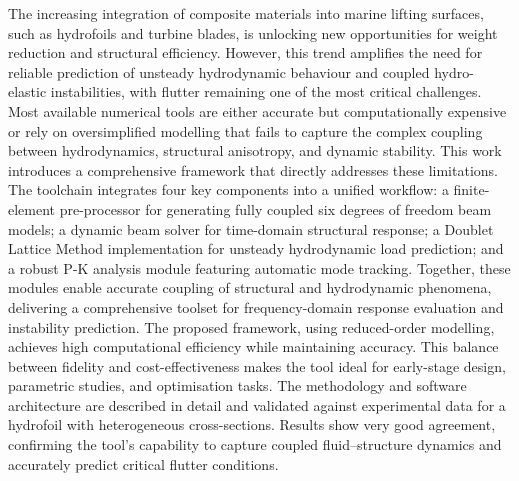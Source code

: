 


%    
%    

The increasing integration of composite materials into marine lifting surfaces, such as hydrofoils and turbine blades, 
is unlocking new opportunities for weight reduction and structural efficiency. However, this trend amplifies the need for reliable prediction 
of unsteady hydrodynamic behaviour and coupled hydro-elastic instabilities, with flutter remaining one of the most critical challenges. 
Most available numerical tools are either accurate but computationally expensive or rely on oversimplified modelling that fails to capture the complex 
coupling between hydrodynamics, structural anisotropy, and dynamic stability.
This work introduces a comprehensive framework that directly addresses these limitations. 
The toolchain integrates four key components into a unified workflow: a finite-element pre-processor for generating fully coupled 
six degrees of freedom beam models; a dynamic beam solver for time-domain structural response; a Doublet Lattice Method implementation for unsteady 
hydrodynamic load prediction; and a robust P-K analysis module featuring automatic mode tracking. 
Together, these modules enable accurate coupling of structural and hydrodynamic phenomena, delivering a comprehensive toolset for frequency-domain response 
evaluation and instability prediction.
The proposed framework, using reduced-order modelling, achieves high computational efficiency while maintaining accuracy.
This balance between fidelity and cost-effectiveness makes the tool ideal for early-stage design, parametric studies, and optimisation tasks.
The methodology and software architecture are described in detail and validated against experimental data for a hydrofoil with heterogeneous cross-sections.
Results show very good agreement, confirming the tool’s capability to capture coupled fluid–structure dynamics and accurately predict critical flutter conditions.
